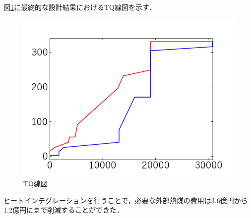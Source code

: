 \documentclass[a4j]{jsreport}
\begin{document}
図\ref{TQ線図}に最終的な設計結果におけるTQ線図を示す．
\begin{figure}[htbp]
  \centering
  \includegraphics[scale=0.7]{TQ.png}
  \caption{TQ線図}
  \label{TQ線図}
\end{figure}

ヒートインテグレーションを行うことで，必要な外部熱煤の費用は3.6億円から1.2億円にまで削減することができた．

\clearpage
\end{document}
